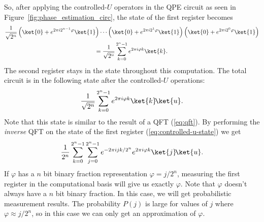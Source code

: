 \documentclass[11pt, notitlepage]{report}
\begin{document}
So, after applying the controlled-$U$ operators in the QPE circuit as seen in Figure~\ref{fig:phase_estimation_circ}, the state of the first register becomes
\begin{gather}
  \dfrac{1}{\sqrt{2^n}}\left(\ket{0} + e^{2\pi i 2^{n-1} \varphi}\ket{1}\right)
  \dotsb
  \left(\ket{0} + e^{2\pi i 2^1 \varphi}\ket{1}\right)
  \left(\ket{0} + e^{2\pi i 2^0 \varphi}\ket{1}\right) \\
  = \dfrac{1}{\sqrt{2^n}}\sum_{k=0}^{2^n-1} e^{2\pi i\varphi k}\ket{k}.
\end{gather}
The second register stays in the state  throughout this computation. The total circuit is in the following state after the controlled-$U$ operations:
\begin{equation} \label{eq:controlled-u-state}
  \dfrac{1}{\sqrt{2^n}}\sum_{k=0}^{2^n-1} e^{2\pi i\varphi k}\ket{k}\!\ket{u}.
\end{equation}
Note that this state is similar to the result of a QFT (\ref{eq:qft}). By performing the \emph{inverse} QFT on the state of the first register (\ref{eq:controlled-u-state}) we get
\begin{equation}
  \dfrac{1}{2^n}\sum_{k=0}^{2^n-1}\sum_{j=0}^{2^n-1} e^{-2\pi ijk/2^n} e^{2\pi i\varphi k}\ket{j}\!\ket{u}.
\end{equation}
If $\varphi$ has a $n$ bit binary fraction representation $\varphi = j/2^n$, measuring the first register in the computational basis will give us exactly $\varphi$. Note that $\varphi$ doesn't always have a $n$ bit binary fraction. In this case, we will get probabilistic measurement results. The probability $P(j)$ is large for values of $j$ where $\varphi \approx j/2^n$, so in this case we can only get an approximation of $\varphi$.
\end{document}
